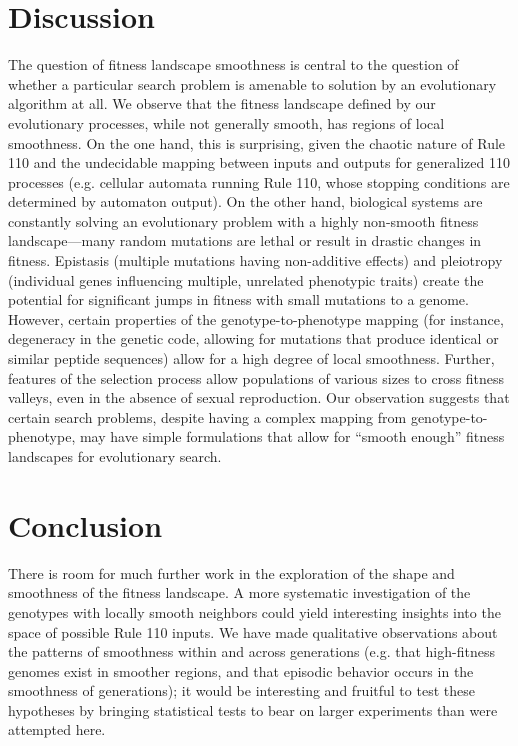 \documentclass[twocolumn]{article}
\begin{document}
\section{Discussion}


The question of fitness landscape smoothness is central to the question of whether a particular search problem is amenable to solution by an evolutionary algorithm at all. We observe that the fitness landscape defined by our evolutionary processes, while not generally smooth, has regions of local smoothness. On the one hand, this is surprising, given the chaotic nature of Rule 110 and the undecidable mapping between inputs and outputs for generalized 110 processes (e.g. cellular automata running Rule 110, whose stopping conditions are determined by automaton output). On the other hand, biological systems are constantly solving an evolutionary problem with a highly non-smooth fitness landscape---many random mutations are lethal or result in drastic changes in fitness. Epistasis (multiple mutations having non-additive effects) and pleiotropy (individual genes influencing multiple, unrelated phenotypic traits) create the potential for significant jumps in fitness with small mutations to a genome. \cite{Ostman:2012iq} However, certain properties of the genotype-to-phenotype mapping (for instance, degeneracy in the genetic code, allowing for mutations that produce identical or similar peptide sequences) allow for a high degree of local smoothness.  Further, features of the selection process allow populations of various sizes to cross fitness valleys, even in the absence of sexual reproduction. \cite{Weissman:2009dh} Our observation suggests that certain search problems, despite having a complex mapping from genotype-to-phenotype, may have simple formulations that allow for ``smooth enough'' fitness landscapes for evolutionary search. 

\section{Conclusion}

There is room for much further work in the exploration of the shape and smoothness of the fitness landscape. A more systematic investigation of the genotypes with locally smooth neighbors could yield interesting insights into the space of possible Rule 110 inputs. We have made qualitative observations about the patterns of smoothness within and across generations (e.g. that high-fitness genomes exist in smoother regions, and that episodic behavior occurs in the smoothness of generations); it would be interesting and fruitful to test these hypotheses by bringing statistical tests to bear on larger experiments than were attempted here.
\end{document}
